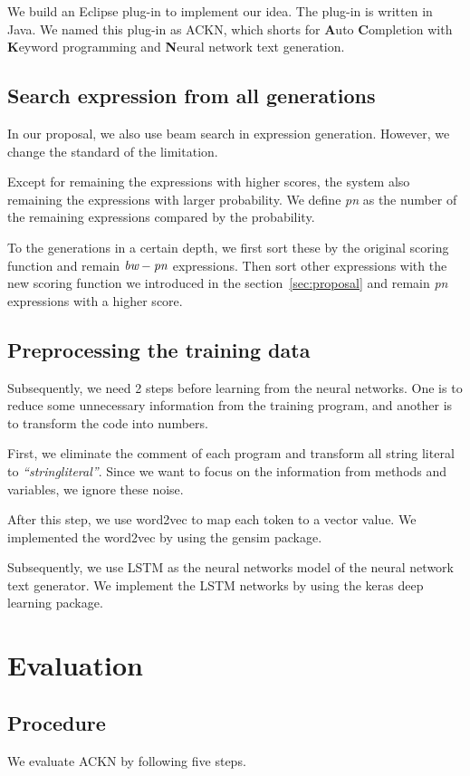 \documentclass[PRO,english]{ipsj}
\begin{document}
We build an Eclipse plug-in to implement our idea. The plug-in is written in Java. We named this plug-in as ACKN, which shorts for \textbf{A}uto \textbf{C}ompletion with \textbf{K}eyword programming and \textbf{N}eural network text generation.

\subsection{Search expression from all generations}
In our proposal, we also use beam search in expression
generation. However, we change the standard of the limitation. 

Except for remaining the expressions with higher scores, the system also remaining the expressions with larger probability. We define \emph{pn} as the number of the remaining expressions compared by the probability. 

To the generations in a certain depth, we first sort these by the original scoring function and remain $\emph{bw} - \emph{pn}$ expressions. Then sort other expressions with the new scoring function we introduced in the section~\ref{sec:proposal} and remain \emph{pn} expressions with a higher score.

\subsection{Preprocessing the training data}
\label{subsection:Preprocessing}
Subsequently, we need 2 steps before learning from the neural networks. One is to reduce some unnecessary information from the training program, and another is to transform the code into numbers.

First, we eliminate the comment of each program and transform all string literal to \textit{``stringliteral''}. Since we want to focus on the information from methods and variables, we ignore these noise.

After this step, we use word2vec to map each token to a vector value. We implemented the word2vec by using the gensim package.

Subsequently, we use LSTM as the neural networks model of the neural network text generator. We implement the LSTM networks by using the keras deep learning package.

\section{Evaluation}\label{sec:evaluation}
\subsection{Procedure}
We evaluate ACKN by following five steps. 
\end{document}
